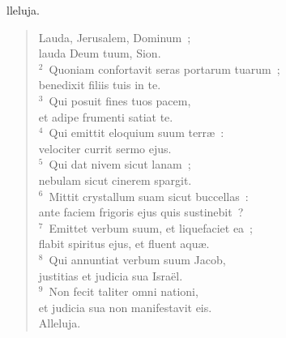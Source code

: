 \bchapter
{}lleluja. \begin{flushleft}\begin{verse}\vspace{6pt}Lauda, Jerusalem, Dominum~;\\ lauda Deum tuum, Sion.\\
${}^{2}$~Quoniam confortavit seras portarum tuarum~;\\ benedixit filiis tuis in te.\\
${}^{3}$~Qui posuit fines tuos pacem,\\ et adipe frumenti satiat te.\\
${}^{4}$~Qui emittit eloquium suum terr\ae~:\\ velociter currit sermo ejus.\\
${}^{5}$~Qui dat nivem sicut lanam~;\\ nebulam sicut cinerem spargit.\\
${}^{6}$~Mittit crystallum suam sicut buccellas~:\\ ante faciem frigoris ejus quis sustinebit~?\\
${}^{7}$~Emittet verbum suum, et liquefaciet ea~;\\ flabit spiritus ejus, et fluent aqu\ae .\\
${}^{8}$~Qui annuntiat verbum suum Jacob,\\ justitias et judicia sua Isra\"el.\\
${}^{9}$~Non fecit taliter omni nationi,\\ et judicia sua non manifestavit eis.\\ Alleluja.\end{verse}\end{flushleft}



